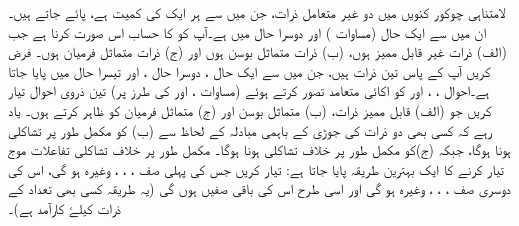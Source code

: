 لامتناہی چوکور کنویں میں دو غیر متعامل ذرات، جن میں سے ہر ایک کی کمیت  ہے، پائے جاتے ہیں۔ ان میں سے ایک حال  (مساوات ) اور دوسرا حال   میں ہے۔آپ کو  کا حساب اس صورت کرنا ہے جب (الف) ذرات غیر قابل ممیز ہوں، (ب) ذرات متماثل بوسن ہوں اور (ج) ذرات متماثل فرمیان ہوں۔
فرض کریں آپ کے پاس تین ذرات ہیں، جن میں سے ایک حال ، دوسرا حال ، اور تیسرا حال  میں پایا جاتا ہے۔احوال ، ، اور  کو اکائی متعامد تصور کرتے ہوئے (مساوات ،  اور  کی طرز پر) تین ذروی احوال تیار کریں جو (الف) قابل ممیز ذرات، (ب) متماثل بوسن اور (ج) متماثل فرمیان کو ظاہر کرتے ہوں۔ یاد رہے کہ کسی بھی دو ذرات کی جوڑی کے باہمی مبادلہ کے لحاظ سے (ب) کو مکمل طور پر تشاکلی ہونا ہوگا، جبکہ (ج)کو مکمل طور پر خلاف تشاکلی ہونا ہوگا۔  مکمل طور پر خلاف تشاکلی تفاعلات موج تیار کرنے کا ایک بہترین طریقہ پایا جاتا ہے:  تیار کریں جس کی پہلی صف ، ، ، وغیرہ ہو گی، اس کی دوسری صف ، ، ، وغیرہ ہو گی اور اسی طرح اس کی باقی صفیں ہوں گی (یہ طریقہ کسی بھی تعداد کے ذرات کیلۓ کارآمد ہے)۔

